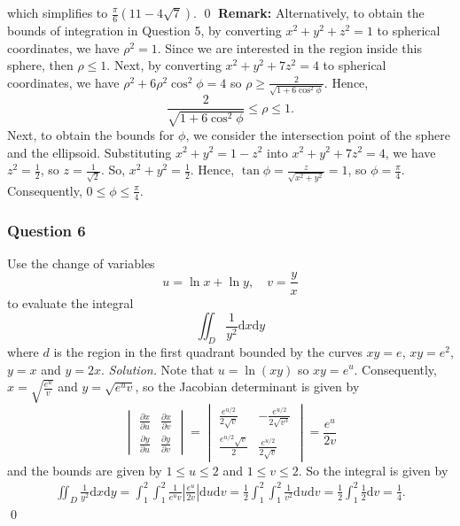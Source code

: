 \documentclass[12pt, twoside=false]{scrbook}
\newcounter{a}
\begin{document}
which simplifies to $\frac{\pi}{6}\left(11-4\sqrt{7}\right)$. \qed 
\newline
\newline \textbf{Remark:} Alternatively, to obtain the bounds of integration in Question 5, by converting $x^2+y^2+z^2=1$ to spherical coordinates, we have $\rho^2=1$. Since we are interested in the region inside this sphere, then $\rho \le 1$. Next, by converting $x^2+y^2+7z^2=4$ to spherical coordinates, we have $\rho^2+6\rho^2\cos^2\phi=4$ so $\rho \ge \frac{2}{\sqrt{1+6\cos^2\phi}}$. Hence, \[\frac{2}{\sqrt{1+6\cos^2\phi}}\le \rho \le 1.\]
Next, to obtain the bounds for $\phi$, we consider the intersection point of the sphere and the ellipsoid. Substituting $x^2+y^2=1-z^2$ into $x^2+y^2+7z^2=4$, we have $z^2=\frac{1}{2}$, so $z=\frac{1}{\sqrt{2}}$. So, $x^2+y^2=\frac{1}{2}$. Hence, $\tan\phi= \frac{z}{\sqrt{x^2+y^2}}=1$, so $\phi=\frac{\pi}{4}$. Consequently, $0\le \phi\le \frac{\pi}{4}$.
\subsubsection*{Question 6}
Use the change of variables 
    $$u=\ln x+\ln y, \quad v=\frac{y}{x}$$
    to evaluate the integral
    $$\iint_D\frac{1}{y^2}\text{d}x\text{d}y$$
    where $d$ is the region in the first quadrant bounded by the curves $xy=e$, $xy=e^2$, $y=x$ and $y=2x$.
\newline
\newline \textit{Solution.} Note that $u=\ln \left(xy\right)$ so $xy=e^u$. Consequently, $x=\sqrt{\frac{e^u}{v}}$ and $y=\sqrt{e^uv}$, so the Jacobian determinant is given by
$$\begin{vmatrix}
    \displaystyle\frac{\partial x}{\partial u} & \displaystyle\frac{\partial x}{\partial v}\\
    \displaystyle\frac{\partial y}{\partial u} & \displaystyle\frac{\partial y}{\partial v}
\end{vmatrix}=\begin{vmatrix}
    \displaystyle\frac{e^{u/2}}{2\sqrt{v}} & \displaystyle-\frac{e^{u/2}}{2\sqrt{v^3}}\\
    \displaystyle\frac{e^{u/2}\sqrt{v}}{2} & \displaystyle\frac{e^{u/2}}{2\sqrt{v}}
\end{vmatrix}=\frac{e^u}{2v}$$
and the bounds are given by $1\leq u\leq 2$ and $1\leq v\leq 2$. So the integral is given by
\begin{align*}
    \iint_D\frac{1}{y^2}\text{d}x\text{d}y = \int_1^2\int_1^2\frac{1}{e^uv}\left|\frac{e^u}{2v}\right|\text{d}u\text{d}v= \frac{1}{2}\int_1^2\int_1^2\frac{1}{v^2}\text{d}u\text{d}v= \frac{1}{2}\int_1^2\frac{1}{2}\text{d}v= \frac{1}{4}.
\end{align*}\qed 
\end{document}
